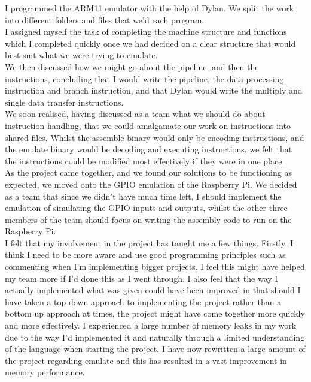 I programmed the ARM11 emulator with the help of Dylan. We split the work into different folders and files that we'd each program.
~\\

I assigned myself the task of completing the machine structure and functions which I completed quickly once we had decided on a clear structure that would best suit what we were trying to emulate.
~\\

We then discussed how we might go about the pipeline, and then the instructions, concluding that I would write the pipeline, the data processing instruction and branch instruction, and that Dylan would write the multiply and single data transfer instructions.
~\\

We soon realised, having discussed as a team what we should do about instruction handling, that we could amalgamate our work on instructions into shared files. Whilst the assemble binary would only be encoding instructions, and the emulate binary would be decoding and executing instructions, we felt that the instructions could be modified most effectively if they were in one place.
~\\

As the project came together, and we found our solutions to be functioning as expected, we moved onto the GPIO emulation of the Raspberry Pi. We decided as a team that since we didn't have much time left, I should implement the emulation of simulating the GPIO inputs and outputs, whilst the other three members of the team should focus on writing the assembly code to run on the Raspberry Pi.
~\\

I felt that my involvement in the project has taught me a few things. Firstly, I think I need to be more aware and use good programming principles such as commenting when I'm implementing bigger projects. I feel this might have helped my team more if I'd done this as I went through. I also feel that the way I actually implemented what was given could have been improved in that should I have taken a top down approach to implementing the project rather than a bottom up approach at times, the project might have come together more quickly and more effectively. I experienced a large number of memory leaks in my work due to the way I'd implemented it and naturally through a limited understanding of the language when starting the project. I have now rewritten a large amount of the project regarding emulate and this has resulted in a vast improvement in memory performance.